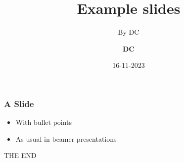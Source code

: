 \documentclass{DCslides}
\title{Example slides}
\subtitle{By DC}
\author{\textbf{DC}}
\institute{}
\date{16-11-2023}
\begin{document}
\frame[plain]{\titlepage}

\begin{frame}
\frametitle{A Slide}
\begin{itemize}
\item With bullet points
\item As usual in beamer presentations
\end{itemize}
\end{frame}

\begin{frame}
\begin{greenbox}
THE END
\end{greenbox}
\end{frame}
\end{document}
